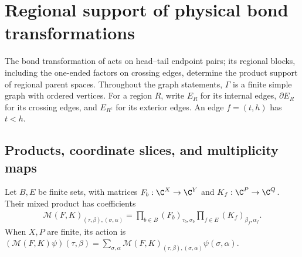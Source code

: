 \section{Regional support of physical bond transformations}
\label{sec:peps_semiregular_parent_support}

The bond transformation of \cite[Section~7]{Schuch2010PEPS} acts on
head--tail endpoint pairs; its regional blocks, including the
one-ended factors on crossing edges, determine the product support of
regional parent spaces. Throughout the graph statements, $\Gamma$ is a
finite simple graph with ordered vertices. For a region $R$, write $E_R$
for its internal edges, $\partial E_R$ for its crossing edges, and
$E_{R^c}$ for its exterior edges. An edge $f=(t,h)$ has $t<h$.

\subsection{Products, coordinate slices, and multiplicity maps}

\begin{definition}%
    \label{def:peps_parent_support_mixed_product}
    \leanok
    Let $B,E$ be finite sets, with matrices $F_b:\C^X\to\C^Y$
    and $K_f:\C^P\to\C^Q$. Their mixed product has coefficients
    \begin{align}
        \mathcal M(F,K)_{(\tau,\beta),(\sigma,\alpha)}
        =\prod_{b\in B}(F_b)_{\tau_b,\sigma_b}
        \prod_{f\in E}(K_f)_{\beta_f,\alpha_f}.
        \label{eq:peps_parent_support_mixed_product}
    \end{align}
    When $X,P$ are finite, its action is
    $(\mathcal M(F,K)\psi)(\tau,\beta)
        =\sum_{\sigma,\alpha}\mathcal M(F,K)_{(\tau,\beta),(\sigma,\alpha)}
        \psi(\sigma,\alpha)$.
\end{definition}


